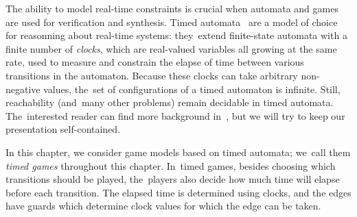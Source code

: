 

The ability to model real-time constraints is crucial when automata
and games are used for verification and synthesis. Timed
automata~\cite{AD94} are a model of choice for reasonning about
real-time systems: they~extend finite-state automata with a
finite number of \emph{clocks}, which are real-valued variables all
growing at the same rate, used to measure and constrain the elapse of
time between various transitions in the automaton. Because these
clocks can take arbitrary non-negative values, the~set of
configurations of a timed automaton is infinite. Still, reachability
(and~many other problems) remain decidable in timed
automata. The~interested reader can find more background
in~\cite{AD94}, but we will try to keep our presentation self-contained.

In this chapter, we consider game models based on timed automata;
we~call them \emph{timed games} throughout this chapter. In~timed
games, besides choosing which transitions should be played,
the~players also decide how much time will elapse before each
transition. The elapsed time is determined using clocks, and the edges have
guards which determine clock values for which the edge can be taken.










